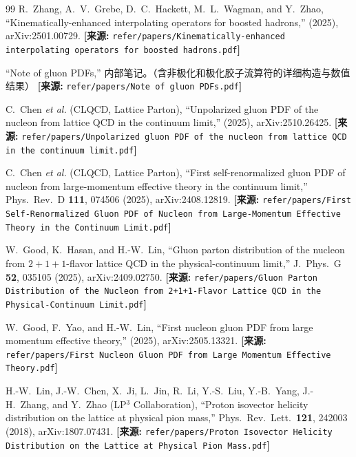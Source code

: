 \documentclass[12pt,a4paper]{ctexart}
\theoremstyle{definition}
\begin{document}
\begin{thebibliography}{99}
R.~Zhang, A.~V.~Grebe, D.~C.~Hackett, M.~L.~Wagman, and Y.~Zhao,
``Kinematically-enhanced interpolating operators for boosted hadrons,''
(2025), arXiv:2501.00729.
\quad\textbf{[来源:} \texttt{refer/papers/Kinematically-enhanced interpolating operators for boosted hadrons.pdf}\textbf{]}


``Note of gluon PDFs,''
内部笔记。（含非极化和极化胶子流算符的详细构造与数值结果）
\quad\textbf{[来源:} \texttt{refer/papers/Note of gluon PDFs.pdf}\textbf{]}


C.~Chen \textit{et al.} (CLQCD, Lattice Parton),
``Unpolarized gluon PDF of the nucleon from lattice QCD in the continuum limit,''
(2025), arXiv:2510.26425.
\quad\textbf{[来源:} \texttt{refer/papers/Unpolarized gluon PDF of the nucleon from lattice QCD in the continuum limit.pdf}\textbf{]}

C.~Chen \textit{et al.} (CLQCD, Lattice Parton),
``First self-renormalized gluon PDF of nucleon from large-momentum effective theory in the continuum limit,''
Phys.\ Rev.\ D \textbf{111}, 074506 (2025), arXiv:2408.12819.
\quad\textbf{[来源:} \texttt{refer/papers/First Self-Renormalized Gluon PDF of Nucleon from Large-Momentum Effective Theory in the Continuum Limit.pdf}\textbf{]}

W.~Good, K.~Hasan, and H.-W.~Lin,
``Gluon parton distribution of the nucleon from $2+1+1$-flavor lattice QCD in the physical-continuum limit,''
J.\ Phys.\ G \textbf{52}, 035105 (2025), arXiv:2409.02750.
\quad\textbf{[来源:} \texttt{refer/papers/Gluon Parton Distribution of the Nucleon from 2+1+1-Flavor Lattice QCD in the Physical-Continuum Limit.pdf}\textbf{]}

W.~Good, F.~Yao, and H.-W.~Lin,
``First nucleon gluon PDF from large momentum effective theory,''
(2025), arXiv:2505.13321.
\quad\textbf{[来源:} \texttt{refer/papers/First Nucleon Gluon PDF from Large Momentum Effective Theory.pdf}\textbf{]}

H.-W.~Lin, J.-W.~Chen, X.~Ji, L.~Jin, R.~Li, Y.-S.~Liu, Y.-B.~Yang, J.-H.~Zhang, and Y.~Zhao (LP$^3$ Collaboration),
``Proton isovector helicity distribution on the lattice at physical pion mass,''
Phys.\ Rev.\ Lett.\ \textbf{121}, 242003 (2018), arXiv:1807.07431.
\quad\textbf{[来源:} \texttt{refer/papers/Proton Isovector Helicity Distribution on the Lattice at Physical Pion Mass.pdf}\textbf{]}


\end{thebibliography}
\end{document}

